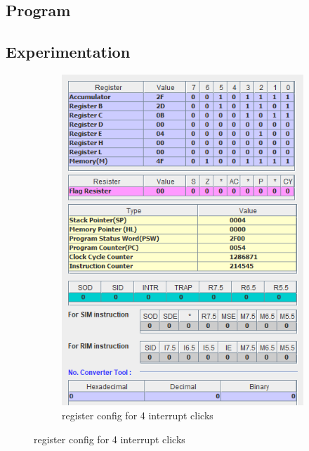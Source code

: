 \documentclass[a4paper]{article} %
\begin{document}
    \subsection{Program}
        
        \newpage
    \subsection{Experimentation}
        \begin{figure}[h!]
            \centering
            \begin{subfigure}[b]{0.49\linewidth}
                \centering
                \includegraphics[width=\linewidth]{Assignment 5/1_ISR/4-click.png}
                \caption{register config for 4 interrupt clicks}
                \label{fg11a}
            \end{subfigure}

\end{figure}
\end{document}
